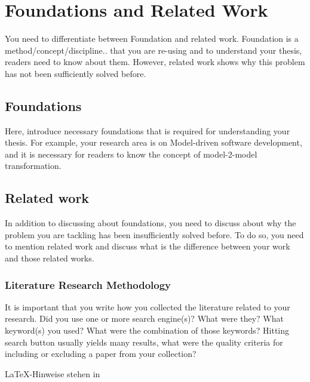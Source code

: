 
\section{Foundations and Related Work}
\label{chap:ch2}





You need to differentiate between Foundation and related work. Foundation is a method/concept/discipline.. that you are re-using and to understand your thesis, readers need to know about them. However, related work shows why this problem has not been sufficiently solved before.

\subsection{Foundations}
Here, introduce necessary foundations that is required for understanding your thesis. For example, your research area is on Model-driven software development, and it is necessary for readers to know the concept of model-2-model transformation.
\subsection{Related work}
In addition to discussing about foundations, you need to discuss about why the problem you are tackling has been insufficiently solved before. To do so, you need to mention related work and discuss what is the difference between your work and those related works.
\subsubsection{Literature Research Methodology}
It is important that you write how you collected the literature related to your research. Did you use one or more search engine(s)? What were they? What keyword(s) you used? What were the combination of those keywords?
Hitting search button usually yields many results, what were the quality criteria for including or  excluding a paper from your collection?




LaTeX-Hinweise stehen in %

